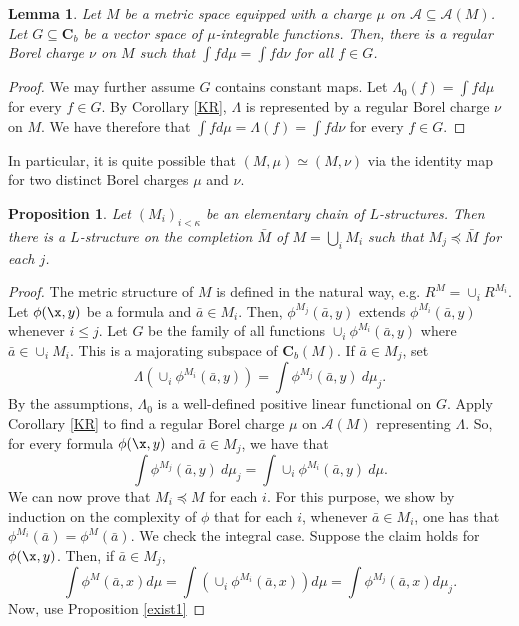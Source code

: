 \documentclass[12pt]{article}
\newtheorem{lemma}[theorem]{Lemma}
\newtheorem{proposition}[theorem]{Proposition}
\def\a{\bar {a}}\def\b{\bar {b}}\def\c{\bar {c}}
\begin{document}
\begin{lemma}
Let $M$ be a metric space equipped with a charge $\mu$ on $\mathcal A\subseteq\mathcal{A}(M)$.
Let $G\subseteq\mathbf{C}_b$ be a vector space of $\mu$-integrable functions.
Then, there is a regular Borel charge $\nu$ on $M$ such that $\int fd\mu=\int fd\nu$ for all $f\in G$.
\end{lemma}
\begin{proof}
We may further assume $G$ contains constant maps. Let $\Lambda_0(f)=\int fd\mu$ for every $f\in G$. By Corollary \ref{KR},
$\Lambda$ is represented by a regular Borel charge $\nu$ on $M$. We have therefore that $\int fd\mu=\Lambda(f)=\int fd\nu$ for every $f\in G$.
\end{proof}

In particular, it is quite possible that $(M,\mu)\simeq(M,\nu)$ via the identity map
for two distinct Borel charges $\mu$ and $\nu$.

\begin{proposition}\label{chain2}
Let $(M_i)_{i<\kappa}$ be an elementary chain of $L$-structures.
Then there is a $L$-structure on the completion $\bar M$ of $M=\bigcup_i{M_i}$ such that $M_j\preccurlyeq\bar M$ for each $j$.
\end{proposition}
\begin{proof} The metric structure of $M$ is defined in the natural way,
e.g. $R^M=\cup_i R^{M_i}$. Let $\phi(\x,y)$ be a formula and $\a\in M_i$.
Then, $\phi^{M_j}(\a,y)$ extends $\phi^{M_i}(\a,y)$ whenever $i\leqslant j$.
Let $G$ be the family of all functions $\cup_i\phi^{M_i}(\a,y)$ where $\a\in\cup_{i} M_i$.
This is a majorating subspace of $\mathbf{C}_b(M)$.
If $\a\in M_j$, set $$\Lambda(\cup_i\phi^{M_i}(\a,y))=\int \phi^{M_j}(\a,y)\ d\mu_j.$$
By the assumptions, $\Lambda_0$ is a well-defined positive linear functional on $G$. Apply Corollary \ref{KR}
to find a regular Borel charge $\mu$ on $\mathcal A(M)$ representing $\Lambda$.
So, for every formula $\phi(\x,y)$ and $\a\in M_j$, we have that $$\int \phi^{M_j}(\a,y)\ d\mu_j=\int\cup_i\phi^{M_i}(\a,y)\ d\mu.$$
We can now prove that $M_i\preccurlyeq M$ for each $i$. For this purpose, we show by induction
on the complexity of $\phi$ that for each $i$, whenever $\a\in M_i$, one has that $\phi^{M_i}(\a)=\phi^M(\a)$.
We check the integral case. Suppose the claim holds for $\phi(\x,y)$. Then, if $\a\in M_j$,
$$\int\phi^M(\a,x)d\mu=\int(\cup_i\phi^{M_i}(\a,x))d\mu=\int\phi^{M_j}(\a,x)d\mu_j.$$
Now, use Proposition \ref{exist1}
\end{proof}
\end{document}
